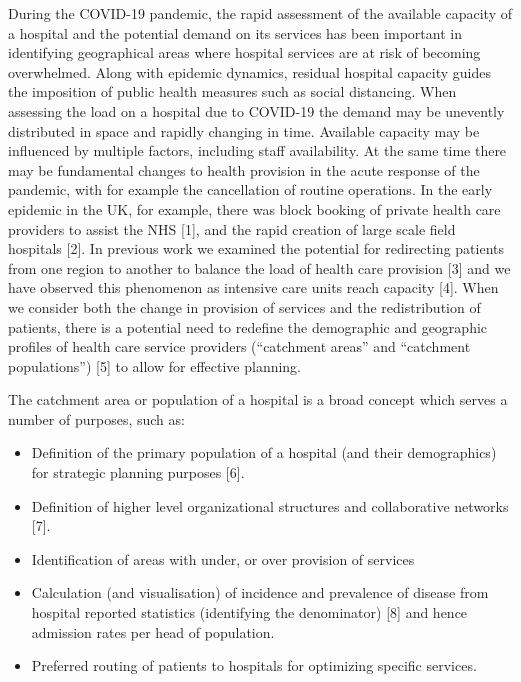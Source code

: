 \documentclass[
]{article}
\providecommand{\tightlist}{%
  \setlength{\itemsep}{0pt}\setlength{\parskip}{0pt}}
\begin{document}
During the COVID-19 pandemic, the rapid assessment of the available
capacity of a hospital and the potential demand on its services has been
important in identifying geographical areas where hospital services are
at risk of becoming overwhelmed. Along with epidemic dynamics, residual
hospital capacity guides the imposition of public health measures such
as social distancing. When assessing the load on a hospital due to
COVID-19 the demand may be unevently distributed in space and rapidly
changing in time. Available capacity may be influenced by multiple
factors, including staff availability. At the same time there may be
fundamental changes to health provision in the acute response of the
pandemic, with for example the cancellation of routine operations. In
the early epidemic in the UK, for example, there was block booking of
private health care providers to assist the NHS {[}1{]}, and the rapid
creation of large scale field hospitals {[}2{]}. In previous work we
examined the potential for redirecting patients from one region to
another to balance the load of health care provision {[}3{]} and we have
observed this phenomenon as intensive care units reach capacity {[}4{]}.
When we consider both the change in provision of services and the
redistribution of patients, there is a potential need to redefine the
demographic and geographic profiles of health care service providers
(``catchment areas'' and ``catchment populations'') {[}5{]} to allow for
effective planning.

The catchment area or population of a hospital is a broad concept which
serves a number of purposes, such as:

\begin{itemize}
\tightlist
\item
  Definition of the primary population of a hospital (and their
  demographics) for strategic planning purposes {[}6{]}.
\item
  Definition of higher level organizational structures and collaborative
  networks {[}7{]}.
\item
  Identification of areas with under, or over provision of services
\item
  Calculation (and visualisation) of incidence and prevalence of disease
  from hospital reported statistics (identifying the denominator)
  {[}8{]} and hence admission rates per head of population.
\item
  Preferred routing of patients to hospitals for optimizing specific
  services.
\end{itemize}
\end{document}

